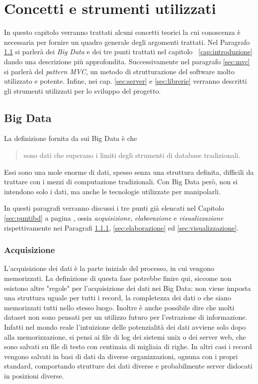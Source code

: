 \chapter{Concetti e strumenti utilizzati}\label{cap:concetti}
In questo capitolo verranno trattati alcuni concetti teorici la cui conoscenza è necessaria per fornire un quadro generale degli argomenti trattati. Nel Paragrafo \ref{sec:bigdata} si parlerà dei \emph{Big Data} e dei tre punti trattati nel capitolo~ \ref{cap:introduzione} dando una descrizione più approfondita. Successivamente nel paragrafo \ref{sec:mvc} si parlerà del \emph{pattern MVC}, un metodo di strutturazione del software molto utilizzato e potente. Infine, nei cap. \ref{sec:server} e \ref{sec:librerie} verranno descritti gli strumenti utilizzati per lo sviluppo del progetto.


\section{Big Data}\label{sec:bigdata}
La definizione fornita da \cite{rezzani2013big} sui Big Data è che
\begin{quote}
sono dati che superano i limiti degli strumenti di database tradizionali.
\end{quote} 
Essi sono una mole enorme di dati, spesso senza una struttura definita, difficili da trattare con i mezzi di computazione tradizionali. Con Big Data però, non si intendono solo i dati, ma anche le tecnologie utilizzate per manipolarli.

In questi paragrafi verranno discussi i tre punti già elencati nel Capitolo \ref{sec:puntibd} a pagina \pageref{sec:puntibd}, ossia \emph{acquisizione}, \emph{elaborazione} e \emph{visualizzazione} rispettivamente nei Paragrafi \ref{sec:acquisizione}, \ref{sec:elaborazione} ed \ref{sec:visualizzazione}.


\subsection{Acquisizione}\label{sec:acquisizione}
L'acquisizione dei dati è la parte iniziale del processo, in cui vengono memorizzati. La definizione di questa fase potrebbe finire qui, siccome non esistono altre "regole" per l'acquisizione dei dati nei Big Data: non viene imposta una struttura uguale per tutti i record, la completezza dei dati o che siano memorizzati tutti nello stesso luogo. Inoltre è anche possibile dire che molti dataset non sono pensati per un utilizzo futuro per l'estrazione di informazione. Infatti nel mondo reale l'intuizione delle potenzialità dei dati avviene solo dopo alla memorizzazione, si pensi ai file di log dei sistemi unix o dei server web, che sono salvati su file di testo con centinaia di migliaia di righe. In altri casi i record vengono salvati in basi di dati da diverse organizzazioni, ognuna con i propri standard, comportando strutture dei dati diverse e probabilmente server dislocati in posizioni diverse.

